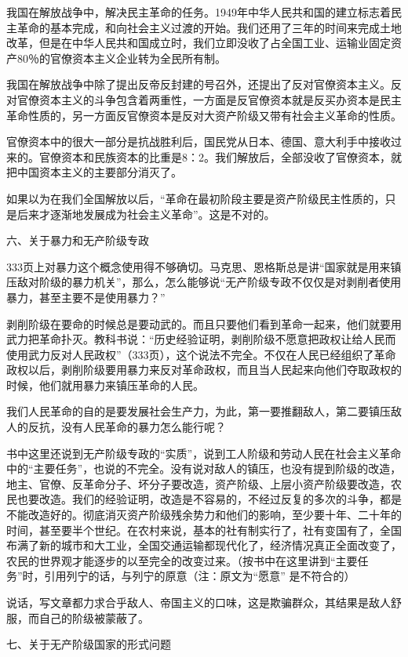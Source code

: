 我国在解放战争中，解决民主革命的任务。1949年中华人民共和国的建立标志着民主革命的基本完成，和向社会主义过渡的开始。我们还用了三年的时间来完成土地改革，但是在中华人民共和国成立时，我们立即没收了占全国工业、运输业固定资产80％的官僚资本主义企业转为全民所有制。

我国在解放战争中除了提出反帝反封建的号召外，还提出了反对官僚资本主义。反对官僚资本主义的斗争包含着两重性，一方面是反官僚资本就是反买办资本是民主革命性质的，另一方面反官僚资本是反对大资产阶级又带有社会主义革命的性质。

官僚资本中的很大一部分是抗战胜利后，国民党从日本、德国、意大利手中接收过来的。官僚资本和民族资本的比重是8：2。我们解放后，全部没收了官僚资本，就把中国资本主义的主要部分消灭了。

如果以为在我们全国解放以后，“革命在最初阶段主要是资产阶级民主性质的，只是后来才逐渐地发展成为社会主义革命”。这是不对的。

六、关于暴力和无产阶级专政

333页上对暴力这个概念使用得不够确切。马克思、恩格斯总是讲“国家就是用来镇压敌对阶级的暴力机关”，那么，怎么能够说“无产阶级专政不仅仅是对剥削者使用暴力，甚至主要不是使用暴力？”

剥削阶级在要命的时候总是要动武的。而且只要他们看到革命一起来，他们就要用武力把革命扑灭。教科书说：“历史经验证明，剥削阶级不愿意把政权让给人民而使用武力反对人民政权”（333页），这个说法不完全。不仅在人民已经组织了革命政权以后，剥削阶级要用暴力来反对革命政权，而且当人民起来向他们夺取政权的时候，他们就用暴力来镇压革命的人民。

我们人民革命的自的是要发展社会生产力，为此，第一要推翻敌人，第二要镇压敌人的反抗，没有人民革命的暴力怎么能行呢？

书中这里还说到无产阶级专政的“实质”，说到工人阶级和劳动人民在社会主义革命中的“主要任务”，也说的不完全。没有说对敌人的镇压，也没有提到阶级的改造，地主、官僚、反革命分子、坏分子要改造，资产阶级、上层小资产阶级要改造，农民也要改造。我们的经验证明，改造是不容易的，不经过反复的多次的斗争，都是不能改造好的。彻底消灭资产阶级残余势力和他们的影响，至少要十年、二十年的时间，甚至要半个世纪。在农村来说，基本的社有制实行了，社有变国有了，全国布满了新的城市和大工业，全国交通运输都现代化了，经济情况真正全面改变了，农民的世界观才能逐步的以至完全的改变过来。（按书中在这里讲到“主要任务”时，引用列宁的话，与列宁的原意（注：原文为“愿意” 是不符合的）

说话，写文章都力求合乎敌人、帝国主义的口味，这是欺骗群众，其结果是敌人舒服，而自己的阶级被蒙蔽了。

七、关于无产阶级国家的形式问题

